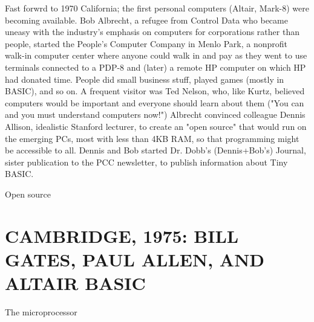 \documentclass{article}
\begin{document}



Fast forwrd to 1970 California; the first personal computers (Altair,
Mark-8) were becoming available.  Bob Albrecht, a refugee from Control
Data who became uneasy with the industry's emphasis on computers for
corporations rather than people, 
started the People's Computer Company in Menlo Park, a nonprofit walk-in
computer center where anyone could walk in and pay as they went to use
terminals connected to a PDP-8 and (later) a remote HP computer on which
HP had donated time.  People did small business stuff, played games
(mostly in BASIC), and so on.
A frequent visitor was Ted Nelson, who, like Kurtz, believed computers
would be important and everyone should learn about them ("You can and
you must understand computers now!")
Albrecht convinced colleague Dennis Allison,
idealistic Stanford lecturer, to create an "open source"  that
would run on the emerging PCs, most with less than 4KB RAM, so that
programming might be accessible to all.  Dennis and
Bob started Dr. Dobb's (Dennis+Bob's) Journal, sister publication to the
PCC newsletter, to publish information about Tiny BASIC.

\begin{milestone}{Open source}

\end{milestone}

\section{CAMBRIDGE, 1975: BILL GATES, PAUL ALLEN, AND ALTAIR BASIC}


\begin{milestone}{The microprocessor}

\end{milestone}


\end{document}
